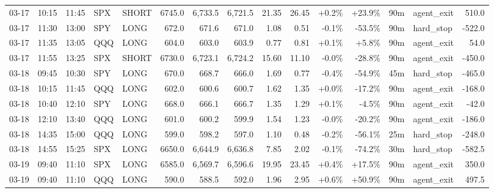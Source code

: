 \documentclass[11pt,a4paper,twoside]{article}
\begin{document}
\begin{landscape}
\begin{center}
\begin{longtable}{>{\color{txtmain}}l l l l l r r r r r r r r >{\color{txtmain}}l r}
03-17 & 10:15 & 11:45 & SPX & SHORT & 6745.0 & 6,733.5 & 6,721.5 & 21.35 & 26.45 & \textcolor{wingreen}{+0.2\%} & \textcolor{wingreen}{+23.9\%} & 90m & agent\_exit & \textcolor{wingreen}{510.0} \\
03-17 & 11:30 & 13:00 & SPY & LONG & 672.0 & 671.6 & 671.0 & 1.08 & 0.51 & \textcolor{lossred}{-0.1\%} & \textcolor{lossred}{-53.5\%} & 90m & hard\_stop & \textcolor{lossred}{-522.0} \\
03-17 & 11:35 & 13:05 & QQQ & LONG & 604.0 & 603.0 & 603.9 & 0.77 & 0.81 & \textcolor{wingreen}{+0.1\%} & \textcolor{wingreen}{+5.8\%} & 90m & agent\_exit & \textcolor{wingreen}{54.0} \\
03-17 & 11:55 & 13:25 & SPX & SHORT & 6730.0 & 6,723.1 & 6,724.2 & 15.60 & 11.10 & \textcolor{lossred}{-0.0\%} & \textcolor{lossred}{-28.8\%} & 90m & agent\_exit & \textcolor{lossred}{-450.0} \\
03-18 & 09:45 & 10:30 & SPY & LONG & 670.0 & 668.7 & 666.0 & 1.69 & 0.77 & \textcolor{lossred}{-0.4\%} & \textcolor{lossred}{-54.9\%} & 45m & hard\_stop & \textcolor{lossred}{-465.0} \\
03-18 & 10:15 & 11:45 & QQQ & LONG & 602.0 & 600.6 & 600.7 & 1.62 & 1.35 & \textcolor{wingreen}{+0.0\%} & \textcolor{lossred}{-17.2\%} & 90m & agent\_exit & \textcolor{lossred}{-168.0} \\
03-18 & 10:40 & 12:10 & SPY & LONG & 668.0 & 666.1 & 666.7 & 1.35 & 1.29 & \textcolor{wingreen}{+0.1\%} & \textcolor{lossred}{-4.5\%} & 90m & agent\_exit & \textcolor{lossred}{-42.0} \\
03-18 & 12:10 & 13:40 & QQQ & LONG & 601.0 & 600.2 & 599.9 & 1.54 & 1.23 & \textcolor{lossred}{-0.0\%} & \textcolor{lossred}{-20.2\%} & 90m & agent\_exit & \textcolor{lossred}{-186.0} \\
03-18 & 14:35 & 15:00 & QQQ & LONG & 599.0 & 598.2 & 597.0 & 1.10 & 0.48 & \textcolor{lossred}{-0.2\%} & \textcolor{lossred}{-56.1\%} & 25m & hard\_stop & \textcolor{lossred}{-248.0} \\
03-18 & 14:55 & 15:25 & SPX & LONG & 6650.0 & 6,644.9 & 6,636.8 & 7.85 & 2.02 & \textcolor{lossred}{-0.1\%} & \textcolor{lossred}{-74.2\%} & 30m & hard\_stop & \textcolor{lossred}{-582.5} \\
03-19 & 09:40 & 11:10 & SPX & LONG & 6585.0 & 6,569.7 & 6,596.6 & 19.95 & 23.45 & \textcolor{wingreen}{+0.4\%} & \textcolor{wingreen}{+17.5\%} & 90m & agent\_exit & \textcolor{wingreen}{350.0} \\
03-19 & 09:40 & 11:10 & QQQ & LONG & 590.0 & 588.5 & 592.0 & 1.96 & 2.95 & \textcolor{wingreen}{+0.6\%} & \textcolor{wingreen}{+50.9\%} & 90m & agent\_exit & \textcolor{wingreen}{497.5} \\

\end{longtable}
\end{center}
\end{landscape}
\end{document}
